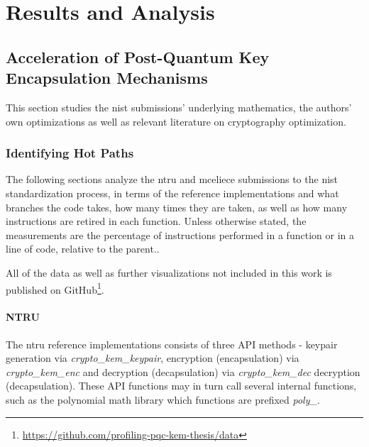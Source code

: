 \chapter{Results and Analysis}
\label{chapter:results}

\section{Acceleration of Post-Quantum Key Encapsulation Mechanisms}


This section studies the \gls{nist} submissions' underlying mathematics, the authors' own optimizations as well as relevant literature on cryptography optimization.

\subsection{Identifying Hot Paths}
\label{section:results:hot-paths}

The following sections analyze the \gls{ntru} and \gls{mceliece} submissions to the \gls{nist} standardization process, in terms of the reference implementations and what branches the code takes, how many times they are taken, as well as how many instructions are retired in each function. Unless otherwise stated, the measurements are the percentage of instructions performed in a function or in a line of code, relative to the parent..

All of the data as well as further visualizations not included in this work is published on GitHub\footnote{\href{https://github.com/profiling-pqc-kem-thesis/data}{https://github.com/profiling-pqc-kem-thesis/data}}.

\subsubsection{NTRU}

The \gls{ntru} reference implementations consists of three API methods - keypair generation via \textit{crypto\_kem\_keypair}, encryption (encapsulation) via \textit{crypto\_kem\_enc} and decryption (decapsulation) via \textit{crypto\_kem\_dec}  decryption (decapsulation). These API functions may in turn call several internal functions, such as the polynomial math library which functions are prefixed \textit{poly\_}.

